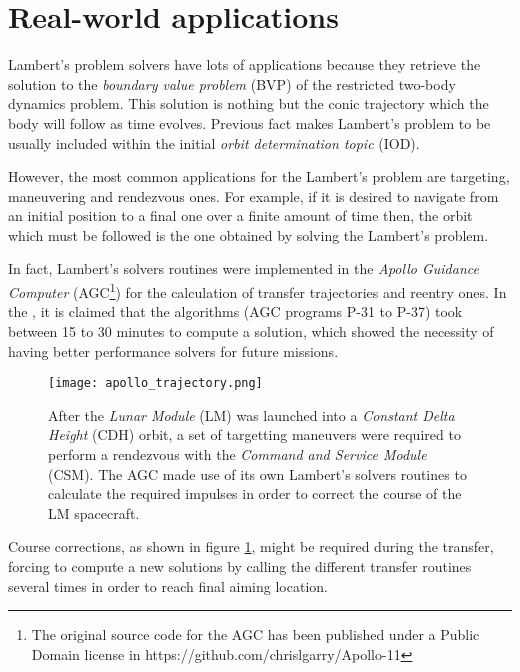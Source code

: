 \newpage
\section{Real-world applications}
\label{sec:applications}

Lambert's problem solvers have lots of applications because they retrieve the
solution to the \textit{boundary value problem} (BVP) of the restricted two-body
dynamics problem.  This solution is nothing but the conic trajectory which the
body will follow as time evolves. Previous fact makes Lambert's problem to be
usually included within the initial \textit{orbit determination topic} (IOD).

However, the most common applications for the Lambert's problem are targeting,
maneuvering and rendezvous ones. For example, if it is desired to navigate from
an initial position to a final one over a finite amount of time then, the orbit
which must be followed is the one obtained by solving the Lambert's problem.

In fact, Lambert's solvers routines were implemented in the \textit{Apollo
  Guidance Computer} (AGC\footnote{The original source code for the AGC has been
  published under a Public Domain license in
  https://github.com/chrislgarry/Apollo-11}) for the calculation of transfer
trajectories and reentry ones. In the , it is claimed that
the algorithms (AGC programs P-31 to P-37) took between 15 to 30 minutes to
compute a solution, which showed the necessity of having better performance
solvers for future missions.

\vspace{0.5cm}
\begin{figure}[h]
  \centering
  \texttt{[image: apollo\_trajectory.png]}
  \caption{After the \textit{Lunar Module} (LM) was launched into a
    \textit{Constant Delta Height} (CDH) orbit, a set of targetting
    maneuvers were required to perform a rendezvous with the \textit{Command
      and Service Module} (CSM). The AGC made use of its own Lambert's
    solvers routines to calculate the required impulses in order to correct
    the course of the LM spacecraft.}
  \label{fig:apollo_trajectory}
\end{figure}

Course corrections, as shown in figure \ref{fig:apollo_trajectory}, might be
required during the transfer, forcing to compute a new solutions by calling the
different transfer routines several times in order to reach final aiming
location.

